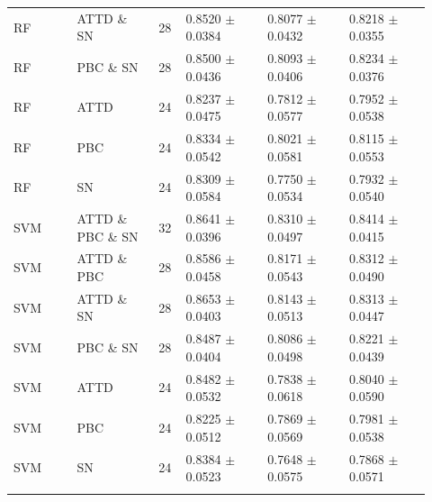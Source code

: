 \documentclass[10pt,a4paper]{article}
\renewcommand{\arraystretch}{1.10}
\newcommand{\classifiersep}{\addlinespace[1pt]\midrule\addlinespace[1pt]}
\begin{document}
\begin{landscape}
\begin{longtable}{@{}L{0.14\linewidth}L{0.18\linewidth}C{0.06\linewidth}C{0.18\linewidth}C{0.18\linewidth}C{0.18\linewidth}@{}}
RF & ATTD \& SN & 28 & 0.8520 $\pm$ 0.0384 & 0.8077 $\pm$ 0.0432 & 0.8218 $\pm$ 0.0355 \\
RF & PBC \& SN & 28 & 0.8500 $\pm$ 0.0436 & 0.8093 $\pm$ 0.0406 & 0.8234 $\pm$ 0.0376 \\
RF & ATTD & 24 & 0.8237 $\pm$ 0.0475 & 0.7812 $\pm$ 0.0577 & 0.7952 $\pm$ 0.0538 \\
RF & PBC & 24 & 0.8334 $\pm$ 0.0542 & 0.8021 $\pm$ 0.0581 & 0.8115 $\pm$ 0.0553 \\
RF & SN & 24 & 0.8309 $\pm$ 0.0584 & 0.7750 $\pm$ 0.0534 & 0.7932 $\pm$ 0.0540 \\
\classifiersep
SVM & ATTD \& PBC \& SN & 32 & 0.8641 $\pm$ 0.0396 & 0.8310 $\pm$ 0.0497 & 0.8414 $\pm$ 0.0415 \\
SVM & ATTD \& PBC & 28 & 0.8586 $\pm$ 0.0458 & 0.8171 $\pm$ 0.0543 & 0.8312 $\pm$ 0.0490 \\
SVM & ATTD \& SN & 28 & 0.8653 $\pm$ 0.0403 & 0.8143 $\pm$ 0.0513 & 0.8313 $\pm$ 0.0447 \\
SVM & PBC \& SN & 28 & 0.8487 $\pm$ 0.0404 & 0.8086 $\pm$ 0.0498 & 0.8221 $\pm$ 0.0439 \\
SVM & ATTD & 24 & 0.8482 $\pm$ 0.0532 & 0.7838 $\pm$ 0.0618 & 0.8040 $\pm$ 0.0590 \\
SVM & PBC & 24 & 0.8225 $\pm$ 0.0512 & 0.7869 $\pm$ 0.0569 & 0.7981 $\pm$ 0.0538 \\
SVM & SN & 24 & 0.8384 $\pm$ 0.0523 & 0.7648 $\pm$ 0.0575 & 0.7868 $\pm$ 0.0571 \\
\classifiersep
\end{longtable}
\end{landscape}
\normalsize
\renewcommand{\arraystretch}{1.10}
\end{document}
